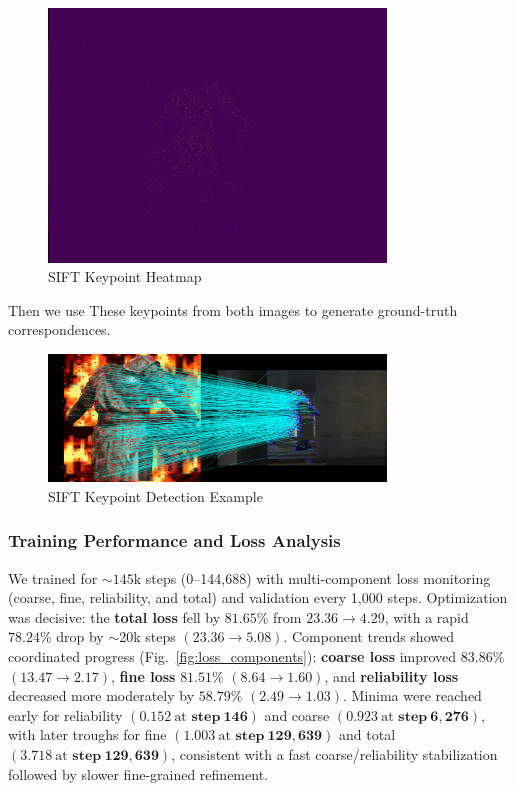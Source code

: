 \begin{figure}[H]
    \centering
    \includegraphics[width=0.8\textwidth]{ressources/image_41_heatmap.png}
    \caption{SIFT Keypoint Heatmap}
\end{figure}
Then we use These keypoints from both images to generate ground-truth correspondences.
\begin{figure}[H]
    \centering
    \includegraphics[width=0.8\textwidth]{ressources/image_41.png}
    \caption{SIFT Keypoint Detection Example}
    \label{fig:sift_example}
\end{figure}
\subsubsection{Training Performance and Loss Analysis}
We trained for \(\sim145\text{k}\) steps (0–144{,}688) with multi-component
loss monitoring (coarse, fine, reliability, and total) and validation every
1{,}000 steps. Optimization was decisive: the \textbf{total loss} fell by
\(\mathbf{81.65\%}\) from \(\mathbf{23.36}\rightarrow\mathbf{4.29}\), with a
rapid \(\mathbf{78.24\%}\) drop by \(\sim\)20k steps \((23.36\rightarrow
5.08)\). Component trends showed coordinated progress
(Fig.~\ref{fig:loss_components}): \textbf{coarse loss} improved
\(\mathbf{83.86\%}\) \((13.47\rightarrow 2.17)\), \textbf{fine loss}
\(\mathbf{81.51\%}\) \((8.64\rightarrow 1.60)\), and \textbf{reliability loss}
decreased more moderately by \(\mathbf{58.79\%}\) \((2.49\rightarrow 1.03)\).
Minima were reached early for reliability \((\mathbf{0.152}\ \text{at }
\mathbf{step\ 146})\) and coarse \((\mathbf{0.923}\ \text{at } \mathbf{step\
    6{,}276})\), with later troughs for fine \((\mathbf{1.003}\ \text{at }
\mathbf{step\ 129{,}639})\) and total \((\mathbf{3.718}\ \text{at }
\mathbf{step\ 129{,}639})\), consistent with a fast coarse/reliability
stabilization followed by slower fine-grained refinement.

